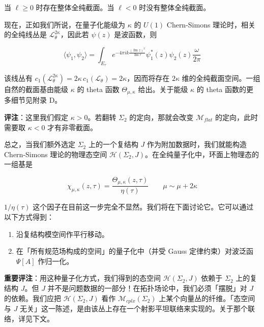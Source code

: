 当 $\ell\ge 0$ 时存在整体全纯截面。当 $\ell<0$ 时没有整体全纯截面。

现在，正如我们所说，在量子化能级为 $\kappa$ 的 $U(1)$ Chern-Simons 理论时，相关的全纯线丛是 $\mathcal{L}_\theta^{2\kappa}$，因此若 $\psi(z)$ 是波函数，则

\begin{equation}
  \langle\psi_1,\psi_2\rangle
  =\int_{E_\tau}e^{-4\pi ik\frac{(\operatorname{Im}z)^2}{\operatorname{Im}\tau}}
  \psi_1^*(z)\psi_2(z)\frac{\omega}{2\pi}
  \tag{2.176}
  \label{eq:2.176}
\end{equation}

该线丛有 $c_1(\mathcal{L}_\theta^{2\kappa})=2\kappa\,c_1(\mathcal{L}_\theta)=2\kappa$，因而将存在 $2\kappa$ 维的全纯截面空间。一组自然的截面基由能级 $\kappa$ 的 theta 函数 $\Theta_{\mu,\kappa}$ 给出。关于能级 $\kappa$ 的 theta 函数的更多细节见附录 D。

\textbf{评注}：这里我们假定 $\kappa>0$。若翻转 $\Sigma_2$ 的定向，那就会改变 $\mathcal{M}_{flat}$ 的定向，此时需要取 $\kappa<0$ 才有非零截面。

总之，当我们额外选定 $\Sigma_2$ 上的一个复结构 $J$ 作为附加数据时，我们就能构造 Chern-Simons 理论的物理态空间 $\mathcal{H}(\Sigma_2,J)$。在全纯量子化中，环面上物理态的一组基是

\begin{equation}
  \chi_{\mu,\kappa}(z,\tau)=\frac{\Theta_{\mu,\kappa}(z,\tau)}{\eta(\tau)}
  \qquad \mu\sim\mu+2\kappa
  \tag{2.177}
  \label{eq:2.177}
\end{equation}

$1/\eta(\tau)$ 这个因子在目前这一步完全不显然。我们将在下面讨论它。它可以通过以下方式得到：

\begin{enumerate}
  \item 沿复结构模空间作平行移动。
  \item 在「所有规范场构成的空间」的量子化中（并受 Gauss 定律约束）对波泛函 $\Psi[A]$ 作归一化。
\end{enumerate}

\textbf{重要评注}：用这种量子化方式，我们得到的态空间 $\mathcal{H}(\Sigma_2,J)$ 依赖于 $\Sigma_2$ 上的复结构 $J$。但 $J$ 并不是问题数据的一部分！在拓扑场论中，我们必须「摆脱」对 $J$ 的依赖。我们应把 $\mathcal{H}(\Sigma_2,J)$ 看作 $\mathcal{M}_{cplx}(\Sigma_2)$ 上某个向量丛的纤维。「态空间与 $J$ 无关」这一陈述，是由该丛上存在一个射影平坦联络来实现的。关于那个联络，详见下文。

